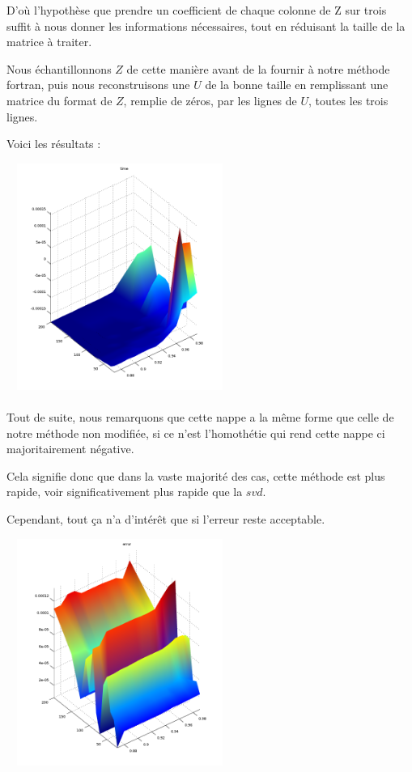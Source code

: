 \documentclass[a4paper,12pt]{article}
\begin{document}
    D'où l'hypothèse que prendre un coefficient de chaque colonne de Z sur trois suffit
    à nous donner les informations nécessaires, tout en réduisant la taille de la
    matrice à traiter.

    Nous échantillonnons $Z$ de cette manière avant de la fournir à notre méthode
    fortran, puis nous reconstruisons une $U$ de la bonne taille en remplissant une
    matrice du format de $Z$, remplie de zéros, par les lignes de $U$, toutes les trois
    lignes.

    Voici les résultats :

    \bigskip
    \begin{center}
    \includegraphics[width=20em, height=20em]{time2_1.png}
    \end{center}

    \paragraph{}
    Tout de suite, nous remarquons que cette nappe a la même forme que celle de
    notre méthode non modifiée, si ce n'est l'homothétie qui rend cette nappe ci
    majoritairement négative.

    Cela signifie donc que dans la vaste majorité des cas, cette méthode est plus
    rapide, voir significativement plus rapide que la $svd$.

    Cependant, tout ça n'a d'intérêt que si l'erreur reste acceptable.

    \bigskip
    \begin{center}
    \includegraphics[width=20em, height=20em]{error2_1.png}
    \end{center}
\end{document}

